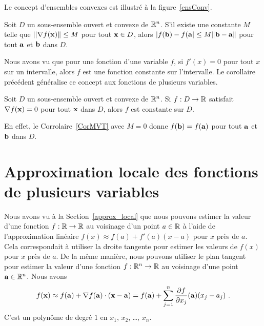 {Le concept d'ensembles convexes est illustré à la figure~\ref{ensConv}.


\begin{cor} \label{CorMVT}
Soit $D$ un sous-ensemble ouvert et convexe de $\mathbb{R}^n$.  S'il existe
une constante $M$ telle que $||\nabla f(\mathbf{x})\| \leq M$ pour tout
$\mathbf{x} \in D$, alors
$|f(\mathbf{b}) - f(\mathbf{a}| \leq M \|\mathbf{b} - \mathbf{a}\|$ pour tout
$\mathbf{a}$ et $\mathbf{b}$ dans $D$.
\end{cor}

Nous avons vu que pour une fonction d'une variable $f$, si $f'(x) = 0$ pour
tout $x$ sur un intervalle, alors $f$ est une fonction constante sur
l'intervalle.  Le corollaire précédent généralise ce concept aux
fonctions de plusieurs variables.

\begin{cor}
Soit $D$ un sous-ensemble ouvert et convexe de $\mathbb{R}^n$.  Si $f:D \to
\mathbb{R}$ satisfait $\nabla f(\mathbf{x}) = 0$ pour tout $\mathbf{x}$ dans $D$,
alors $f$ est constante sur $D$.
\end{cor}

En effet, le Corrolaire~\ref{CorMVT} avec $M=0$ donne
$f(\mathbf{b}) = f(\mathbf{a})$ pour tout $\mathbf{a}$ et $\mathbf{b}$ dans $D$.

\section{Approximation locale des fonctions de plusieurs
  variables \eng}

Nous avons vu à la Section~\ref{approx_local} que nous pouvons estimer la
valeur d'une fonction $f:\mathbb{R} \to \mathbb{R}$ au voisinage d'un point $a \in \mathbb{R}$
à l'aide de l'approximation linéaire $f(x) \approx f(a) + f'(a) (x-a)$
pour $x$ près de $a$.  Cela correspondait à utiliser la droite
tangente pour estimer les valeurs de $f(x)$ pour $x$ près de $a$.  De
la même manière, nous pouvons utiliser le plan tangent pour estimer la
valeur d'une fonction $f:\mathbb{R}^n \to \mathbb{R}$ au voisinage d'une point
$\mathbf{a} \in \mathbb{R}^n$.  Nous avons
\begin{equation}
f(\mathbf{x}) \approx f(\mathbf{a}) + \nabla f(\mathbf{a})\cdot (\mathbf{x} - \mathbf{a})
= f(\mathbf{a}) + \sum_{j=1}^n \frac{\partial f}{\partial x_j}(\mathbf{a}) (x_j - a_j) \ .
\label{linApproDimN}
\end{equation}
C'est un polynôme de degré $1$ en $x_1$, $x_2$, \ldots, $x_n$.

}
